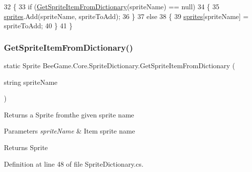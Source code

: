 \begin{DoxyCode}
32         \{
33             \textcolor{keywordflow}{if} (\hyperlink{class_bee_game_1_1_core_1_1_sprite_dictionary_a17fca1828cb89197a540e2e7ab0c43cd}{GetSpriteItemFromDictionary}(spriteName) == null)
34             \{
35                 \hyperlink{class_bee_game_1_1_core_1_1_sprite_dictionary_a40c5e9e2f9f25548971faadbbbde4529}{sprites}.Add(spriteName, spriteToAdd);
36             \}
37             \textcolor{keywordflow}{else}
38             \{
39                 \hyperlink{class_bee_game_1_1_core_1_1_sprite_dictionary_a40c5e9e2f9f25548971faadbbbde4529}{sprites}[spriteName] = spriteToAdd;
40             \}
41         \}
\end{DoxyCode}
\mbox{\label{class_bee_game_1_1_core_1_1_sprite_dictionary_a17fca1828cb89197a540e2e7ab0c43cd}} 
\subsubsection{\texorpdfstring{Get\+Sprite\+Item\+From\+Dictionary()}{GetSpriteItemFromDictionary()}}
{\footnotesize\ttfamily static Sprite Bee\+Game.\+Core.\+Sprite\+Dictionary.\+Get\+Sprite\+Item\+From\+Dictionary (\begin{DoxyParamCaption}\item[{string}]{sprite\+Name }\end{DoxyParamCaption})\hspace{0.3cm}{\ttfamily [static]}}



Returns a Sprite fromthe given sprite name 


\begin{DoxyParams}{Parameters}
{\em sprite\+Name} & Item sprite name\\
\hline
\end{DoxyParams}
\begin{DoxyReturn}{Returns}
Sprite
\end{DoxyReturn}


Definition at line 48 of file Sprite\+Dictionary.\+cs.


